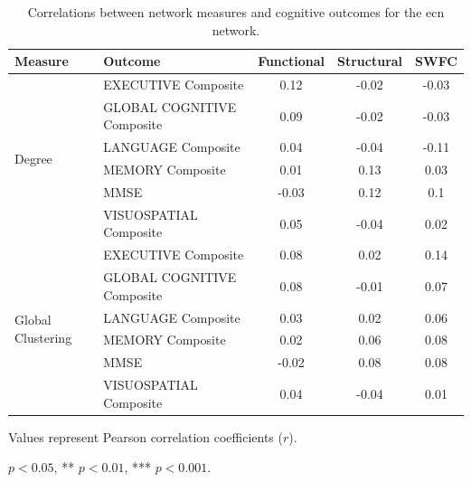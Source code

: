 \begin{table}[htbp]
\centering
\begin{threeparttable}
\caption{Correlations between network measures and cognitive outcomes for the ecn network.}
\small
\begin{tabular}{llccc}
\toprule
Measure & Outcome & Functional & Structural & SWFC \\
\midrule
\multirow{6}{*}{Degree} & EXECUTIVE Composite & 0.12 & -0.02 & -0.03 \\
& GLOBAL COGNITIVE Composite & 0.09 & -0.02 & -0.03 \\
& LANGUAGE Composite & 0.04 & -0.04 & -0.11 \\
& MEMORY Composite & 0.01 & 0.13 & 0.03 \\
& MMSE & -0.03 & 0.12 & 0.1 \\
& VISUOSPATIAL Composite & 0.05 & -0.04 & 0.02 \\
\midrule
\multirow{6}{*}{Global Clustering} & EXECUTIVE Composite & 0.08 & 0.02 & 0.14 \\
& GLOBAL COGNITIVE Composite & 0.08 & -0.01 & 0.07 \\
& LANGUAGE Composite & 0.03 & 0.02 & 0.06 \\
& MEMORY Composite & 0.02 & 0.06 & 0.08 \\
& MMSE & -0.02 & 0.08 & 0.08 \\
& VISUOSPATIAL Composite & 0.04 & -0.04 & 0.01 \\
\bottomrule
\end{tabular}
\begin{tablenotes}
\footnotesize
\item Values represent Pearson correlation coefficients ($r$).
\item * $p<0.05$, ** $p<0.01$, *** $p<0.001$.
\end{tablenotes}
\end{threeparttable}
\end{table}



